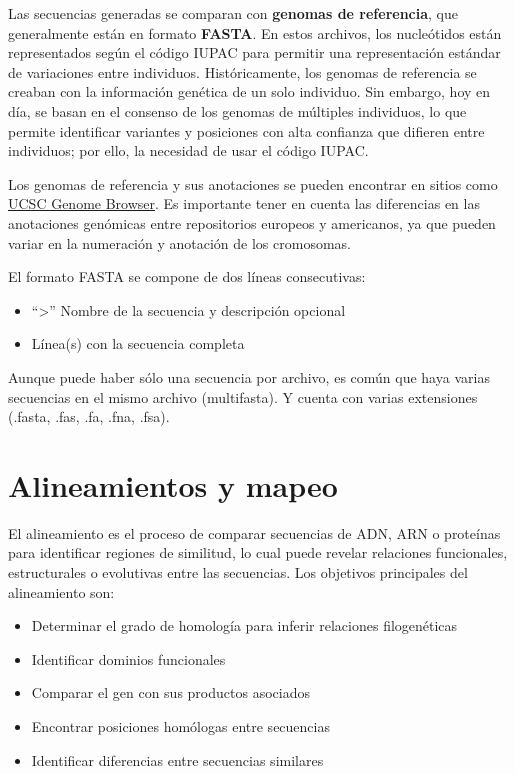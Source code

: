 Las secuencias generadas se comparan con \textbf{genomas de referencia}, que generalmente están en formato \textbf{FASTA}. En estos archivos, los nucleótidos están representados según el código IUPAC para permitir una representación estándar de variaciones entre individuos. Históricamente, los genomas de referencia se creaban con la información genética de un solo individuo. Sin embargo, hoy en día, se basan en el consenso de los genomas de múltiples individuos, lo que permite identificar variantes y posiciones con alta confianza que difieren entre individuos; por ello, la necesidad de usar el código IUPAC.

Los genomas de referencia y sus anotaciones se pueden encontrar en sitios como \href{https://hgdownload.soe.ucsc.edu/downloads.html}{UCSC Genome Browser}. Es importante tener en cuenta las diferencias en las anotaciones genómicas entre repositorios europeos y americanos, ya que pueden variar en la numeración y anotación de los cromosomas.

El formato FASTA se compone de dos líneas consecutivas:
\begin{itemize}
\item “>” Nombre de la secuencia y descripción opcional
\item Línea(s) con la secuencia completa
\end{itemize}
Aunque puede haber sólo una secuencia por archivo, es común que haya varias secuencias en el mismo archivo (multifasta). Y cuenta con varias extensiones (.fasta, .fas, .fa, .fna, .fsa).

\section{Alineamientos y mapeo}
El alineamiento es el proceso de comparar secuencias de ADN, ARN o proteínas para identificar regiones de similitud, lo cual puede revelar relaciones funcionales, estructurales o evolutivas entre las secuencias. Los objetivos principales del alineamiento son:
\begin{itemize}
\item Determinar el grado de homología para inferir relaciones filogenéticas
\item Identificar dominios funcionales
\item Comparar el gen con sus productos asociados
\item Encontrar posiciones homólogas entre secuencias
\item Identificar diferencias entre secuencias similares
\end{itemize}

